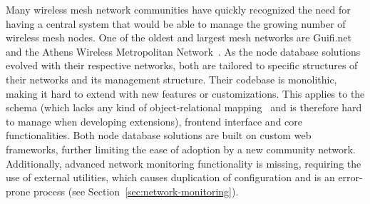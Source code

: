 \documentclass[5p,sort&compress]{elsarticle}
\begin{document}
Many wireless mesh network communities have quickly recognized the need for having a central system that would be able to manage the growing number of wireless mesh nodes.
One of the oldest and largest mesh networks are Guifi.net~\cite{Guifinode_2003,Vega_2012} and the Athens Wireless Metropolitan Network~\cite{AWMN_WIND_2002}.
As the node database solutions evolved with their respective networks, both are tailored to specific structures of their networks and its management structure.
Their codebase is monolithic, making it hard to extend with new features or customizations.
This applies to the schema (which lacks any kind of object-relational mapping~\cite{ONeil_2008} and is therefore hard to manage when developing extensions), frontend interface and core functionalities.
Both node database solutions are built on custom web frameworks, further limiting the ease of adoption by a new community network.
Additionally, advanced network monitoring functionality is missing, requiring the use of external utilities, which causes duplication of configuration and is an error-prone process (see Section~\ref{sec:network-monitoring}).


\newcommand{\push}{$\uparrow$}
\newcommand{\pull}{$\downarrow$}

\newcommand{\no}{$\times$}
\newcommand{\yes}{$\checkmark$}
\newcommand{\maybe}{P}

\newcommand{\static}{S}
\newcommand{\dynamic}{D}
\end{document}
